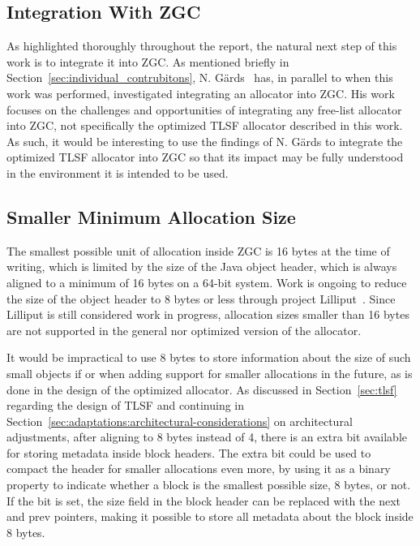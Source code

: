 
\subsection{Integration With ZGC}
\label{sec:future-work:integration}

As highlighted thoroughly throughout the report, the natural next step of this work is to integrate it into ZGC. As mentioned briefly in Section~\ref{sec:individual_contrubitons}, N. Gärds~\cite{niclas_report} has, in parallel to when this work was performed, investigated integrating an allocator into ZGC. His work focuses on the challenges and opportunities of integrating any free-list allocator into ZGC, not specifically the optimized TLSF allocator described in this work. As such, it would be interesting to use the findings of N. Gärds to integrate the optimized TLSF allocator into ZGC so that its impact may be fully understood in the environment it is intended to be used.

\newpage

\subsection{Smaller Minimum Allocation Size}
\label{sec:future-work:lilliput}

The smallest possible unit of allocation inside ZGC is 16 bytes at the time of writing, which is limited by the size of the Java object header, which is always aligned to a minimum of 16 bytes on a 64-bit system. Work is ongoing to reduce the size of the object header to 8 bytes or less through project Lilliput~\cite{lilliput}. Since Lilliput is still considered work in progress, allocation sizes smaller than 16 bytes are not supported in the general nor optimized version of the allocator.

It would be impractical to use 8 bytes to store information about the size of such small objects if or when adding support for smaller allocations in the future, as is done in the design of the optimized allocator. As discussed in Section~\ref{sec:tlsf} regarding the design of TLSF and continuing in Section~\ref{sec:adaptations:architectural-considerations} on architectural adjustments, after aligning to 8 bytes instead of 4, there is an extra bit available for storing metadata inside block headers. The extra bit could be used to compact the header for smaller allocations even more, by using it as a binary property to indicate whether a block is the smallest possible size, 8 bytes, or not. If the bit is set, the size field in the block header can be replaced with the next and prev pointers, making it possible to store all metadata about the block inside 8 bytes.

